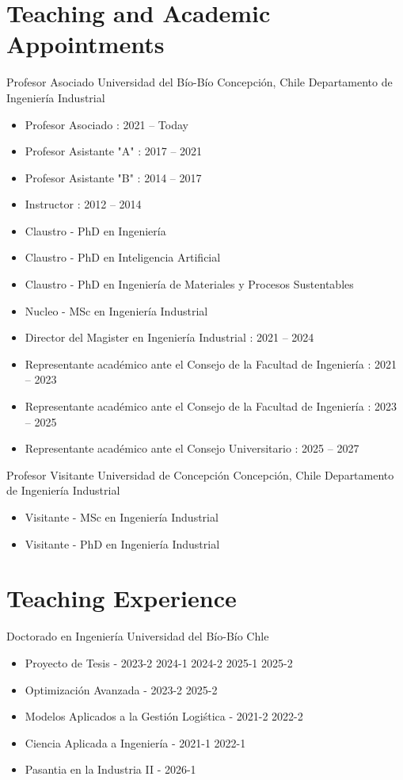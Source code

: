\section{Teaching and Academic Appointments}

{Profesor Asociado}
{Universidad del B\'io-B\'io}
{Concepci\'on, Chile}
{Departamento de Ingenier\'ia Industrial}
{\begin{itemize}
\item Profesor Asociado      : 2021 -- Today
\item Profesor Asistante "A" : 2017 -- 2021
\item Profesor Asistante "B" : 2014 -- 2017
\item Instructor             : 2012 -- 2014
\item Claustro    - PhD en Ingenier\'ia
\item Claustro    - PhD en Inteligencia Artificial
\item Claustro    - PhD en Ingenier\'ia de Materiales y Procesos Sustentables
\item Nucleo      - MSc en Ingenier\'ia Industrial
\item Director del Magister en Ingenier\'ia Industrial                         : 2021 -- 2024
\item Representante acad\'emico ante el Consejo de la Facultad de Ingenier\'ia : 2021 -- 2023
\item Representante acad\'emico ante el Consejo de la Facultad de Ingenier\'ia : 2023 -- 2025
\item Representante acad\'emico ante el Consejo Universitario                  : 2025 -- 2027
\end{itemize}}

{Profesor Visitante}
{Universidad de Concepci\'on}
{Concepci\'on, Chile}
{Departamento de Ingenier\'ia Industrial}
{\begin{itemize}
\item Visitante - MSc en Ingenier\'ia Industrial
\item Visitante - PhD en Ingenier\'ia Industrial
\end{itemize}}

\section{Teaching Experience}


{Doctorado en Ingenier\'ia}
{Universidad del B\'io-B\'io}
{Chle}
{}
{\begin{itemize}
\item Proyecto de Tesis - 2023-2 2024-1 2024-2 2025-1 2025-2
\item Optimizaci\'on Avanzada - 2023-2 2025-2
\item Modelos Aplicados a la Gesti\'on Logi\'stica - 2021-2 2022-2
\item Ciencia Aplicada a Ingenier\'ia - 2021-1 2022-1
\item Pasantia en la Industria II - 2026-1
\end{itemize}}

